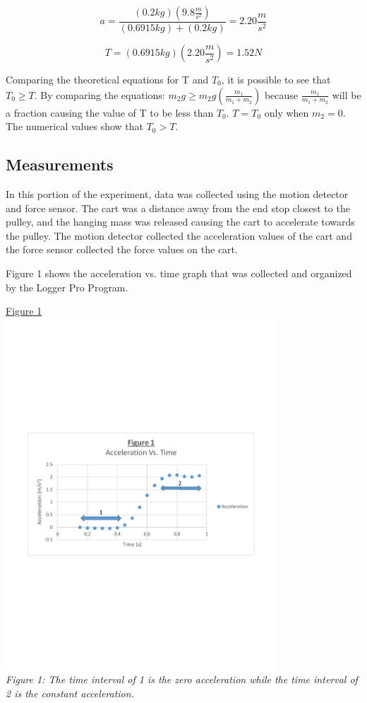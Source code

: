 \documentclass[aps,letterpaper,11pt]{revtex4}
\begin{document}
$$ a = \frac{(0.2kg)(9.8\frac{m}{s^2})}{(0.6915kg) + (0.2kg)} = \boxed{2.20\frac{m}{s^2}}$$

$$ T = (0.6915kg)(2.20\frac{m}{s^2}) = \boxed{1.52N}$$

Comparing the theoretical equations for T and $T_0$, it is possible to see that $T_0 \geq T$. By comparing the equations: $m_2g \geq m_2g(\frac{m_1}{m_1 + m_2})$ because $\frac{m_1}{m_1+m_2}$ will be a fraction causing the value of T to be less than $T_0$. $T= T_0$ only when $m_2 = 0$. The numerical values show that $T_0 > T$.

\subsection{Measurements}

In this portion of the experiment, data was collected using the motion detector and force sensor. The cart was a distance away from the end stop closest to the pulley, and the hanging mass was released causing the cart to accelerate towards the pulley. The motion detector collected the acceleration values of the cart and the force sensor collected the force values on the cart. 

Figure 1 shows the acceleration vs. time graph that was collected and organized by the Logger Pro Program. 

\begin{center}
\underline{Figure 1}\\
\vspace{-30mm}
\includegraphics[width = 4in]{AccelerationVsTimeGraph.pdf}\\
\vspace{-40mm}
\textit{Figure 1: The time interval of 1 is the zero acceleration while the time interval of 2 is the constant acceleration.}
\end{center}
\end{document}
